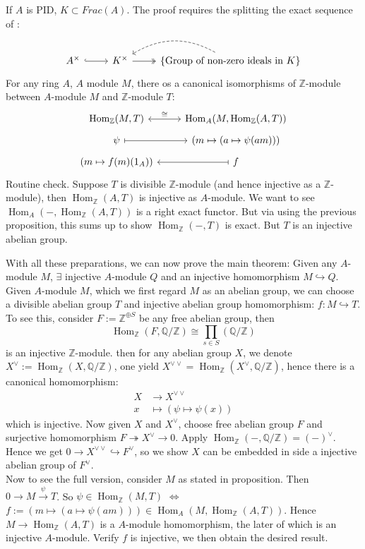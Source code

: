 \documentclass[12pt]{article}
\theoremstyle{definition}
\theoremstyle{plain}
\DeclareMathOperator{\Hom}{Hom}
\newcommand{\rat}{\mathbb{Q}}
\newcommand{\z}{\mathbb{Z}}
\newcommand{\inj}{\hookrightarrow}
\newcommand{\surj}{\twoheadrightarrow}
\begin{document}
\medskip
If $A$ is PID, $K\subset Frac(A)$. The proof requires the splitting the exact sequence of :
\begin{equation}
  \begin{tikzcd}
    A^\times \ar[hook]{r}&K^\times \ar[two heads]{r} &\{\text{Group of non-zero ideals in }K\} \ar[bend right,dashed]{l}
  \end{tikzcd}
\end{equation}
\Prop For any ring $A$, $A$ module $M$, there os a canonical isomorphisms of $\z$-module between $A$-module $M$ and $\z$-module $T$:
\begin{equation}
\begin{tikzcd}[row sep=tiny]
    \Hom_\z(M, T) \ar[<->]{r}{\cong} &\Hom_A(M, \Hom_\z(A, T))\\
  \psi\ar[|->]{r}&(m\mapsto (a\mapsto \psi(am)))\\
  (m\mapsto f(m)(1_A)) &f\ar[|->]{l}
\end{tikzcd}
\end{equation}
\proof Routine check.
\Prop Suppose $T$ is divisible $\z$-module (and hence injective as a $\z$-module), then $\Hom_\z(A, T)$ is injective as $A$-module.
\proof We want to see $\Hom_A(-, \Hom_\z(A, T))$ is a right exact functor. But via using the previous proposition, this sums up to show $\Hom_\z(-, T)$ is exact. But $T$ is an injective abelian group.

\medskip
With all these preparations, we can now prove the main theorem:
\Theo Given any $A$-module $M$, $\exists$ injective $A$-module $Q$ and an injective homomorphism $M\inj Q$.
\proof Given $A$-module $M$, which we first regard $M$ as an abelian group, we can choose a divisible abelian group $T$ and injective abelian group homomorphism: $f: M\inj T$. To see this, consider $F:=\z^{\oplus S}$  be any free abelian group, then
$$\Hom_\z(F, \rat/\z)\cong \prod_{s\in S}(\rat/\z)$$
is an injective $\z$-module. then for any abelian group $X$, we denote $X^\vee:=\Hom_\z(X, \rat/\z)$, one yield $X^{\vee\vee}=\Hom_\z(X^\vee, \rat/\z)$, hence there is a canonical homomorphism:
\begin{align*}
  X&\to X^{\vee\vee}\\
  x &\mapsto (\psi \mapsto \psi(x))
\end{align*}
which is injective.  Now given $X$ and $X^\vee$, choose free abelian group $F$ and surjective homomorphism $F\surj X^\vee\to 0$. Apply $\Hom_\z(-, \rat/\z)=(-)^\vee$. Hence we get $0\to X^{\vee\vee}\inj F^\vee$, so we show $X$ can be embedded in side a injective abelian group of $F^\vee$.\\
Now to see the full version, consider $M$ as stated in proposition. Then $0\to M\overset{\psi}{\to} T$. So $\psi\in \Hom_\z(M, T)$ $\iff$ $f:=(m\mapsto (a\mapsto \psi(am)))\in \Hom_A(M, \Hom_\z(A, T))$. Hence $M\to \Hom_\z(A, T)$ is a $A$-module homomorphism, the later of which is an injective $A$-module. Verify $f$ is injective, we then obtain the desired result.
\end{document}
